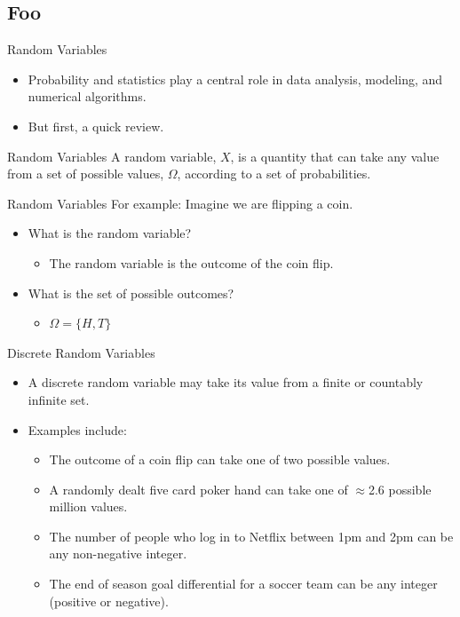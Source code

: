 \documentclass[serif,xcolor=pdftex,dvipsnames,table,hyperref={bookmarks=false,breaklinks}]{beamer}
\begin{document}
\subsection{Foo}

\begin{frame}[t]{Random Variables}
	\begin{itemize}[<+->]
		\item Probability and statistics play a central role in data analysis, modeling, and numerical algorithms. 
		\item But first, a quick review.
	\end{itemize}
	
	\pause
	\begin{block}{Random Variables}
		A random variable, $X$, is a quantity that can take any value from a set of possible values, $\Omega$, according to a set of probabilities.
	\end{block}
\end{frame}
	
\begin{frame}[t]{Random Variables}
	For example: Imagine we are flipping a coin. 
	\pause
	\begin{itemize}[<+->]
		\item What is the random variable?
		\begin{itemize}[<+->]
			\item The random variable is the outcome of the coin flip.
		\end{itemize}
		\item What is the set of possible outcomes?
		\begin{itemize}[<+->]
			\item $\Omega = \{H,T\}$
		\end{itemize}
	\end{itemize}
	
\end{frame}

\begin{frame}[t]{Discrete Random Variables}
	\begin{itemize}[<+->]
		\item A discrete random variable may take its value from a finite or countably infinite set.
		\item Examples include:
		\begin{itemize}[<+->]
			\item The outcome of a coin flip can take one of two possible values.
			\item A randomly dealt five card poker hand can take one of $\approx$2.6 possible million values.
			\item The number of people who log in to Netflix between 1pm and 2pm can be any non-negative integer.
			\item The end of season goal differential for a soccer team can be any integer (positive or negative).
		\end{itemize}
	\end{itemize}
\end{frame}
\end{document}
